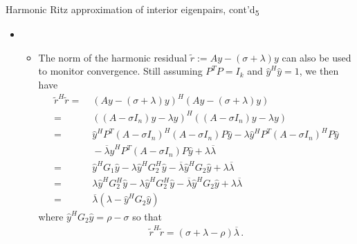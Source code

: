 \documentclass[t,usepdftitle=false]{beamer}
\begin{document}
\begin{frame}{Harmonic Ritz approximation of interior eigenpairs, cont'd\textsubscript{5}}
	\begin{itemize}
	\item[]
	\begin{itemize}\normalsize
	\item The norm of the harmonic residual $\tilde{r}:=Ay-(\sigma+\lambda)y$ can also be used to monitor convergence.
	Still assuming $P^TP=I_k$ and $\hat{y}^H\hat{y}=1$, we then have
	\begin{align*}
		\tilde{r}^H\tilde{r}
		=&\;(Ay-(\sigma+\lambda)y)^H(Ay-(\sigma+\lambda)y)\\
		=&\;((A-\sigma I_n)y-\lambda y)^H((A-\sigma I_n)y-\lambda y)\\
		=&\;\hat{y}^HP^T(A-\sigma I_n)^H(A-\sigma I_n)P\hat{y}
		   -\lambda\hat{y}^HP^T(A-\sigma I_n)^HP\hat{y}\\
		 &\;-\overline{\lambda}\hat{y}^HP^T(A-\sigma I_n)P\hat{y}+\lambda\overline{\lambda}\\
		 =&\;\hat{y}^HG_1\hat{y}-\lambda\hat{y}^HG_2^H\hat{y}-\overline{\lambda}\hat{y}^HG_2\hat{y}+\lambda\overline{\lambda}\\
		 =&\;\lambda\hat{y}^HG_2^H\hat{y}-\lambda\hat{y}^HG_2^H\hat{y}-\overline{\lambda}\hat{y}^HG_2\hat{y}+\lambda\overline{\lambda}\\
		 =&\;\overline{\lambda}(\lambda-\hat{y}^HG_2\hat{y})
	\end{align*}
	where $\hat{y}^HG_2\hat{y}=\rho-\sigma$ so that
	\begin{align*}
		\boxed{\tilde{r}^H\tilde{r}=(\sigma+\lambda-\rho)\overline{\lambda}}\,.
	\end{align*}
	\end{itemize}
	\end{itemize}
\end{frame}
\end{document}
